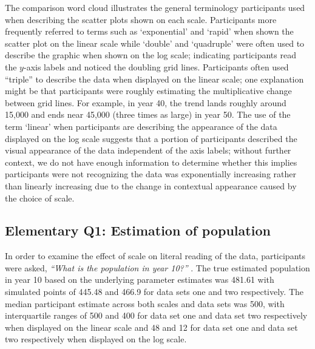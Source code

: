 \documentclass[print]{nuthesis}
\begin{document}
The comparison word cloud illustrates the general terminology participants used when describing the scatter plots shown on each scale.
Participants more frequently referred to terms such as `exponential' and `rapid' when shown the scatter plot on the linear scale while `double' and `quadruple' were often used to describe the graphic when shown on the log scale; indicating participants read the \(y\)-axis labels and noticed the doubling grid lines.
Participants often used ``triple'' to describe the data when displayed on the linear scale; one explanation might be that participants were roughly estimating the multiplicative change between grid lines.
For example, in year 40, the trend lands roughly around 15,000 and ends near 45,000 (three times as large) in year 50.
The use of the term `linear' when participants are describing the appearance of the data displayed on the log scale suggests that a portion of participants described the visual appearance of the data independent of the axis labels; without further context, we do not have enough information to determine whether this implies participants were not recognizing the data was exponentially increasing rather than linearly increasing due to the change in contextual appearance caused by the choice of scale.

\hypertarget{eq1-results}{%
\subsection{Elementary Q1: Estimation of population}\label{eq1-results}}

In order to examine the effect of scale on literal reading of the data, participants were asked, \emph{``What is the population in year 10?''} .
The true estimated population in year 10 based on the underlying parameter estimates was 481.61 with simulated points of 445.48 and 466.9 for data sets one and two respectively.
The median participant estimate across both scales and data sets was 500, with interquartile ranges of 500 and 400 for data set one and data set two respectively when displayed on the linear scale and 48 and 12 for data set one and data set two respectively when displayed on the log scale.
\end{document}
